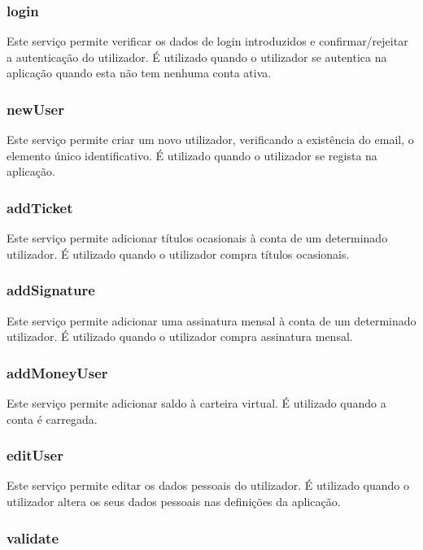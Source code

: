 \subsubsection{login}

Este serviço permite verificar os dados de login introduzidos e confirmar/rejeitar a autenticação do utilizador. É utilizado quando o utilizador se autentica na aplicação quando esta não tem nenhuma conta ativa.

\subsubsection{newUser}

Este serviço permite criar um novo utilizador, verificando a existência do email, o elemento único identificativo. É utilizado quando o utilizador se regista na aplicação.

\subsubsection{addTicket}

Este serviço permite adicionar títulos ocasionais à conta de um determinado utilizador. É utilizado quando o utilizador compra títulos ocasionais.

\subsubsection{addSignature}

Este serviço permite adicionar uma assinatura mensal à conta de um determinado utilizador. É utilizado quando o utilizador compra assinatura mensal.

\subsubsection{addMoneyUser}

Este serviço permite adicionar saldo à carteira virtual. É utilizado quando a conta é carregada.

\subsubsection{editUser}

Este serviço permite editar os dados pessoais do utilizador. É utilizado quando o utilizador altera os seus dados pessoais nas definições da aplicação.

\subsubsection{validate}

